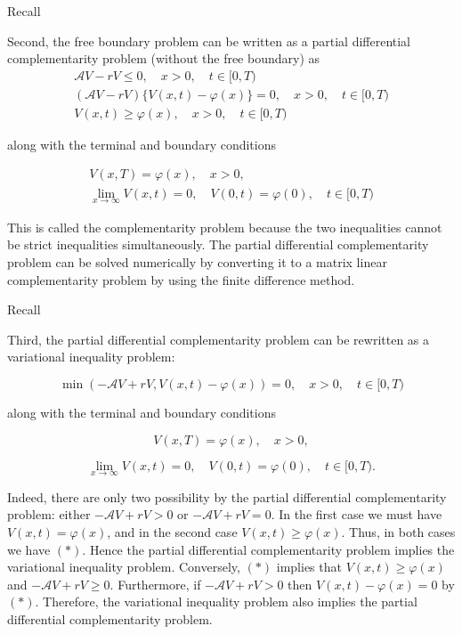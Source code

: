 \documentclass{beamer}
\begin{document}
\begin{frame}{Recall}

    {\footnotesize \footnotesize
    Second, the free boundary problem can be written as a partial differential complementarity problem (without the free boundary) as
    \begin{gather*}
        \mathcal{A} V - rV  \leq  0, \quad x > 0, \quad t \in [0,T) \\
    (\mathcal{A} V - rV) \{ V(x,t) - \varphi(x) \}  =  0, \quad x > 0, \quad t \in [0,T) \\
    V(x,t)  \geq \varphi(x), \quad x > 0, \quad t \in [0,T)
    \end{gather*}
    
    along with the terminal and boundary conditions

    \begin{gather*}
        V(x,T)  =  \varphi(x), \quad x > 0, \\
    \lim_{x \to \infty} V(x,t)  =  0, \quad V(0,t) = \varphi(0), \quad t \in [0,T)
    \end{gather*}

    This is called the complementarity problem because the two inequalities cannot be strict 
    inequalities simultaneously. The partial differential complementarity problem can be solved 
    numerically by converting it to a matrix linear 
    complementarity problem by using the finite difference method.
        }
\end{frame}

\begin{frame}{Recall}

    {\footnotesize \footnotesize
    Third, the partial differential complementarity problem can be rewritten as a variational inequality problem:

    \[
    \min(-\mathcal{A} V + rV, V(x,t) - \varphi(x)) = 0, \quad x > 0, \quad t \in [0,T) \tag{*}
    \]

    along with the terminal and boundary conditions

    \[
    V(x,T) = \varphi(x), \quad x > 0,
    \]

    \[
    \lim_{x \to \infty} V(x,t) = 0, \quad V(0,t) = \varphi(0), \quad t \in [0,T).
    \]

    Indeed, there are only two possibility by the partial differential complementarity 
    problem: either \(-\mathcal{A} V + rV > 0\) or \(-\mathcal{A} V + rV = 0\). In the first case we must 
    have \(V(x,t) = \varphi(x)\), and in the second case \(V(x,t) \geq \varphi(x)\). Thus, 
    in both cases we have $(*)$. Hence the partial differential complementarity problem 
    implies the variational inequality problem.  Conversely, $(*)$ implies that \(V(x,t) \geq \varphi(x)\) 
    and \(-\mathcal{A} V + rV \geq 0\). Furthermore, if \(-\mathcal{A}V + rV > 0\) then \(V(x,t) - \varphi(x) = 0\) by $(*)$. 
    Therefore, the variational inequality problem also implies the partial differential complementarity problem.
        }
\end{frame}
\end{document}
